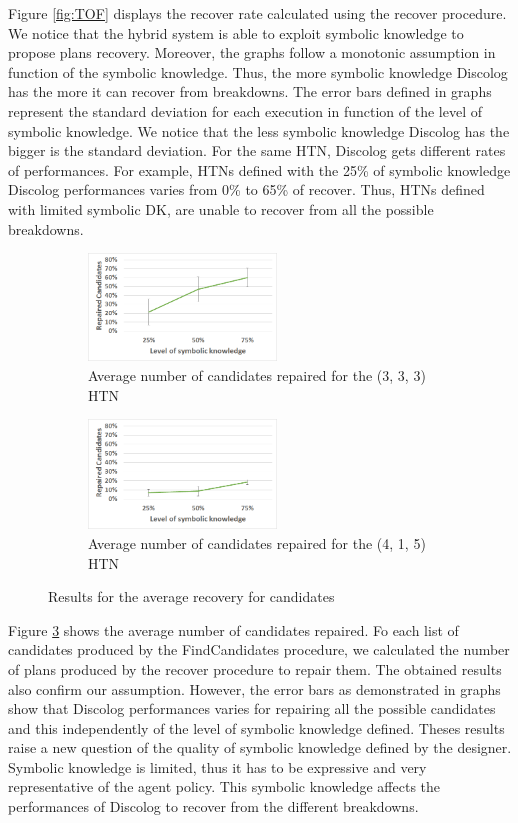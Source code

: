 \documentclass{llncs}
\begin{document}
			
			\par  Figure \ref{fig:TOF}  displays the recover rate calculated using the recover procedure. We notice that the hybrid system is able to exploit  symbolic knowledge to propose plans recovery. Moreover, the graphs follow a monotonic assumption in function of the symbolic knowledge. Thus, the more symbolic knowledge Discolog has the more it can recover from breakdowns. The error bars defined in graphs represent the standard deviation for each execution in function of the level of symbolic knowledge.  We notice that the less symbolic knowledge Discolog has the bigger is the standard deviation.  For the same HTN, Discolog gets different rates of performances. For example, HTNs defined with the 25\% of symbolic knowledge Discolog performances varies from  0\% to 65\%  of recover. Thus, HTNs defined with limited symbolic DK, are unable to recover from all the possible breakdowns. 
			\begin{figure}[t]
								\centering
								\begin{subfigure}{.4\textwidth}
												\centering
												\includegraphics[width=50mm]{Figures/2.png}
												\caption{Average number of candidates repaired for the (3, 3, 3) HTN}
												\label{Fig:Data2}
								\end{subfigure}\hfill
								\begin{subfigure}{.4\textwidth}
												\centering
												\includegraphics[width=50mm]{Figures/4.png}
												\caption{Average number of candidates repaired for the (4, 1, 5) HTN}
												\label{Fig:Data4}
								\end{subfigure}\hfill
								
								\caption{Results for the average recovery for candidates}\label{fig:TOF2}
							\end{figure}
			\par  Figure \ref{fig:TOF2} shows the average number of candidates repaired. Fo each list of candidates produced by the FindCandidates procedure, we calculated the number of plans produced by the recover procedure to repair them. The obtained results also confirm our assumption. However, the error bars as demonstrated in graphs show that Discolog performances varies for repairing all the possible candidates and this independently of the level of symbolic knowledge defined. Theses results raise a new question of the quality of symbolic knowledge defined by the designer. Symbolic knowledge is limited, thus it has to be expressive and very representative of the agent policy. This symbolic knowledge affects the performances of Discolog to recover from the different breakdowns. 
\end{document}
